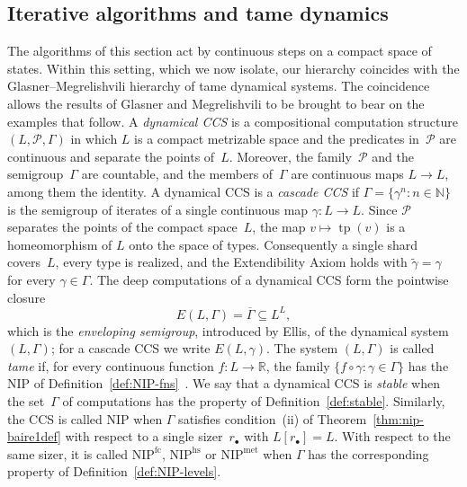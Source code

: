 \documentclass[psamsfonts]{amsart}
\theoremstyle{definition}
\theoremstyle{remark}
\DeclareMathOperator{\tp}{tp}
\newcommand{\NIP}{\text{NIP}}
\numberwithin{equation}{section}
\begin{document}
\subsection{Iterative algorithms and tame dynamics}
\label{sec:dynamical-CCS}
The algorithms of this section act by continuous steps on a compact space of states.
Within this setting, which we now isolate, our hierarchy coincides with the Glasner--Megrelishvili hierarchy of tame dynamical systems.
The coincidence allows the results of Glasner and Megrelishvili to be brought to bear on the examples that follow.
A \emph{dynamical CCS} is a compositional computation structure $(L,\mathcal{P},\Gamma)$ in which $L$ is a compact metrizable space and the predicates in~$\mathcal{P}$ are continuous and separate the points of~$L$.
Moreover, the family~$\mathcal{P}$ and the semigroup~$\Gamma$ are countable, and the members of~$\Gamma$ are continuous maps $L\to L$, among them the identity.
A dynamical CCS is a \emph{cascade CCS} if $\Gamma=\{\gamma^n:n\in\mathbb{N}\}$ is the semigroup of iterates of a single continuous map $\gamma\colon L\to L$.
Since $\mathcal{P}$ separates the points of the compact space~$L$, the map $v\mapsto\tp(v)$ is a homeomorphism of $L$ onto the space of types.
Consequently a single shard covers~$L$, every type is realized, and the Extendibility Axiom holds with $\tilde\gamma=\gamma$ for every $\gamma\in\Gamma$.
The deep computations of a dynamical CCS form the pointwise closure
\[
E(L,\Gamma)=\overline{\Gamma}\subseteq L^L ,
\]
which is the \emph{enveloping semigroup}, introduced by Ellis, of the dynamical system $(L,\Gamma)$;
for a cascade CCS we write $E(L,\gamma)$.
The system $(L,\Gamma)$ is called \emph{tame} if, for every continuous function $f\colon L\to\mathbb{R}$, the family $\{f\circ\gamma:\gamma\in\Gamma\}$ has the $\NIP$ of Definition~\ref{def:NIP-fns}~\cite{Kohler1995,Glasner2006}.
We say that a dynamical CCS is \emph{stable} when the set~$\Gamma$ of computations has the property of Definition~\ref{def:stable}.
Similarly, the CCS is called $\NIP$ when $\Gamma$ satisfies condition~(ii) of Theorem~\ref{thm:nip-baire1def} with respect to a single sizer~$r_\bullet$ with $L[r_\bullet]=L$.
With respect to the same sizer, it is called $\NIP^{\mathrm{fc}}$, $\NIP^{\mathrm{hs}}$ or $\NIP^{\mathrm{met}}$ when $\Gamma$ has the corresponding property of Definition~\ref{def:NIP-levels}.
\end{document}
